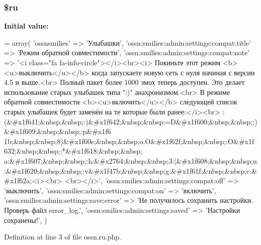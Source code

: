 \subsubsection[{\texorpdfstring{\$ru}{$ru}}]{\setlength{\rightskip}{0pt plus 5cm}\$ru}\hypertarget{components_2_ossn_smilies_2locale_2ossn_8ru_8php_aab84a3feda2b0e489cac7cd194e8d726}{}\label{components_2_ossn_smilies_2locale_2ossn_8ru_8php_aab84a3feda2b0e489cac7cd194e8d726}
{\bfseries Initial value\+:}
\begin{DoxyCode}
= array(
        \textcolor{stringliteral}{'ossnsmilies'} => \textcolor{stringliteral}{'Улыбашки'},
        \textcolor{stringliteral}{'ossn:smilies:admin:settings:compat:title'} => \textcolor{stringliteral}{'Режим обратной совместимости'},
        \textcolor{stringliteral}{'ossn:smilies:admin:settings:compat:note'} => \textcolor{stringliteral}{'<i class="fa fa-info-circle"></i><br><i>}
\textcolor{stringliteral}{        Покиньте этот режим <b><u>выключить</u></b> когда запускаете новую сеть с нуля начиная с версии 4.5
       и выше.<br>}
\textcolor{stringliteral}{        Полный пакет более 1000 эмох теперь доступен. Это делает использование старых улыбашек типа ":)"
       анахронизмом.<br>}
\textcolor{stringliteral}{        В режиме обратной совместимости <b><u>включить</u></b> следующей список старых улыбашек будет
       заменён на те которые были ранее:</i><br>}
\textcolor{stringliteral}{        
      :(&#x1f641;&nbsp;&nbsp;:)&#x1f642;&nbsp;&nbsp;=D&#x1f600;&nbsp;&nbsp;;)&#x1f609;&nbsp;&nbsp;:p&#x1f6
      1b;&nbsp;&nbsp;8)&#x1f60e;&nbsp;&nbsp;o.O&#x1f62f;&nbsp;&nbsp;:O&#x1f632;&nbsp;&nbsp;:*&#x1f618;&nbsp;&nbsp;
      a:&#x1f607;&nbsp;&nbsp;:h:&#x2764;&nbsp;&nbsp;3:|&#x1f608;&nbsp;&nbsp;u:&#x1f620;&nbsp;&nbsp;:v&#x1f47b;&nbsp;&nbsp;g:&#x1f61f;&nbsp;&nbsp;c:&#x1f62a;<i><br>}
\textcolor{stringliteral}{        <br></i>'},
        \textcolor{stringliteral}{'ossn:smilies:admin:settings:compat:off'} => \textcolor{stringliteral}{'выключить'},
        \textcolor{stringliteral}{'ossn:smilies:admin:settings:compat:on'} => \textcolor{stringliteral}{'включить'},
        \textcolor{stringliteral}{'ossn:smilies:admin:settings:save:error'} => \textcolor{stringliteral}{'Не получилось сохранить настройки. Проверь файл
       error\_log.'},
        \textcolor{stringliteral}{'ossn:smilies:admin:settings:saved'} => \textcolor{stringliteral}{'Настройки сохранены!'},
)
\end{DoxyCode}


Definition at line 3 of file ossn.\+ru.\+php.

